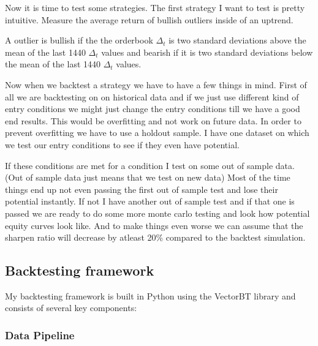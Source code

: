 \documentclass[12pt]{article}
\begin{document}
Now it is time to test some strategies. The first strategy I want to test is pretty intuitive. Measure the average return of bullish outliers inside of an uptrend.

\begin{list}{label}{spacing}
  \item A outlier is bullish if the the orderbook $\Delta_t$ is two standard deviations above the mean of the last 1440 $\Delta_t$ values and bearish if it is two standard deviations below the mean of the last 1440 $\Delta_t$ values.

\end{list}

Now when we backtest a strategy we have to have a few things in mind. First of all we are backtesting on on historical data and if we just use different kind of entry conditions we might just change the entry conditions till we have a good end results. This would be overfitting and not work on future data. 
In order to prevent overfitting we have to use a holdout sample. I have one dataset on which we test our entry conditions to see if they even have potential. 





If these conditions are met for a condition I test on some out of sample data. (Out of sample data just means that we test on new data)
Most of the time things end up not even passing the first out of sample test and lose their potential instantly. If not I have another out of sample test and if that one is passed we are ready to do some more monte carlo testing and look how potential equity curves look like.
And to make things even worse we can assume that the sharpen ratio will decrease by atleast 20\% compared to the backtest simulation.




\newpage


\subsection{Backtesting framework}

My backtesting framework is built in Python using the VectorBT library and consists of several key components:

\subsubsection*{Data Pipeline}
\end{document}
